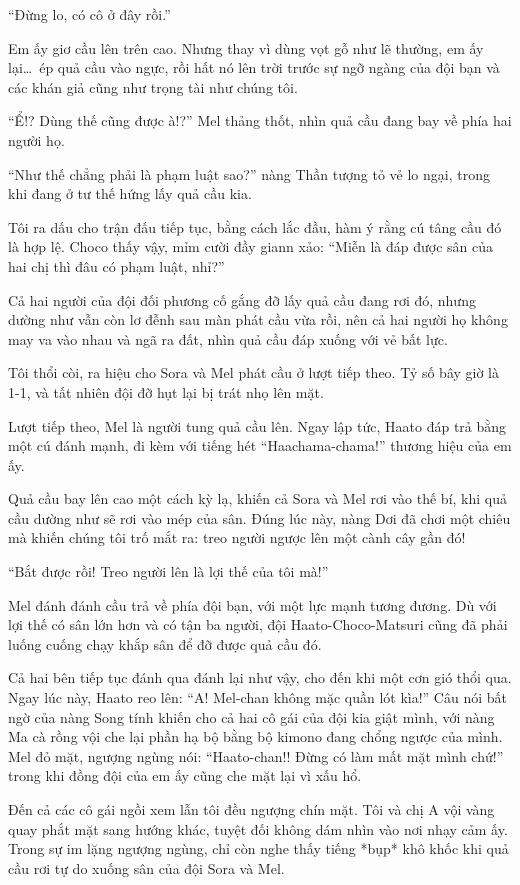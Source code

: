 \documentclass[../main.tex]{subfiles}
\begin{document}
``Đừng lo, có cô ở đây rồi.''

Em ấy giơ cầu lên trên cao. Nhưng thay vì dùng vọt gỗ như lẽ thường, em ấy lại\dots\ ép quả cầu vào ngực, rồi hất nó lên trời trước sự ngỡ ngàng của đội bạn và các khán giả cũng như trọng tài như chúng tôi.

``Ể!? Dùng thế cũng được à!?'' Mel thảng thốt, nhìn quả cầu đang bay về phía hai người họ.

``Như thế chẳng phải là phạm luật sao?'' nàng Thần tượng tỏ vẻ lo ngại, trong khi đang ở tư thế hứng lấy quả cầu kia.

Tôi ra dấu cho trận đấu tiếp tục, bằng cách lắc đầu, hàm ý rằng cú tâng cầu đó là hợp lệ. Choco thấy vậy, mỉm cười đầy giann xảo: ``Miễn là đáp được sân của hai chị thì đâu có phạm luật, nhỉ?''

Cả hai người của đội đối phương cố gắng đỡ lấy quả cầu đang rơi đó, nhưng dường như vẫn còn lơ đễnh sau màn phát cầu vừa rồi, nên cả hai người họ không may va vào nhau và ngã ra đất, nhìn quả cầu đáp xuống với vẻ bất lực.

Tôi thổi còi, ra hiệu cho Sora và Mel phát cầu ở lượt tiếp theo. Tỷ số bây giờ là 1-1, và tất nhiên đội đỡ hụt lại bị trát nhọ lên mặt.

Lượt tiếp theo, Mel là người tung quả cầu lên. Ngay lập tức, Haato đáp trả bằng một cú đánh mạnh, đi kèm với tiếng hét ``Haachama-chama!'' thương hiệu của em ấy.

Quả cầu bay lên cao một cách kỳ lạ, khiến cả Sora và Mel rơi vào thế bí, khi quả cầu dường như sẽ rơi vào mép của sân. Đúng lúc này, nàng Dơi đã chơi một chiêu mà khiến chúng tôi trố mắt ra: treo người ngược lên một cành cây gần đó!

``Bắt được rồi! Treo người lên là lợi thế của tôi mà!''

Mel đánh đánh cầu trả về phía đội bạn, với một lực mạnh tương đương. Dù với lợi thế có sân lớn hơn và có tận ba người, đội Haato-Choco-Matsuri cũng đã phải luống cuống chạy khắp sân để đỡ được quả cầu đó.

Cả hai bên tiếp tục đánh qua đánh lại như vậy, cho đến khi một cơn gió thổi qua. Ngay lúc này, Haato reo lên: ``A! Mel-chan không mặc quần lót kìa!'' Câu nói bất ngờ của nàng Song tính khiến cho cả hai cô gái của đội kia giật mình, với nàng Ma cà rồng vội che lại phần hạ bộ bằng bộ kimono đang chổng ngược của mình. Mel đỏ mặt, ngượng ngùng nói: ``Haato-chan!! Đừng có làm mất mặt mình chứ!'' trong khi đồng đội của em ấy cũng che mặt lại vì xấu hổ.

Đến cả các cô gái ngồi xem lẫn tôi đều ngượng chín mặt. Tôi và chị A vội vàng quay phắt mặt sang hướng khác, tuyệt đối không dám nhìn vào nơi nhạy cảm ấy. Trong sự im lặng ngượng ngùng, chỉ còn nghe thấy tiếng *bụp* khô khốc khi quả cầu rơi tự do xuống sân của đội Sora và Mel.
\end{document}
